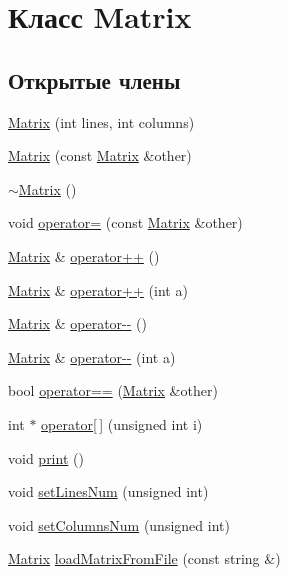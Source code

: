 \hypertarget{class_matrix}{\section{Класс Matrix}
\label{class_matrix}
}
\subsection*{Открытые члены}
\begin{DoxyCompactItemize}
\item 
\hyperlink{class_matrix_ad74c6b0c2db846ab723754759c52dad6}{Matrix} (int lines, int columns)
\item 
\hyperlink{class_matrix_abcf708e864ed3d9db2c3b317c5e529ab}{Matrix} (const \hyperlink{class_matrix}{Matrix} \&other)
\item 
\hyperlink{class_matrix_a9b1c3627f573d78a2f08623fdfef990f}{$\sim$\-Matrix} ()
\item 
void \hyperlink{class_matrix_a3ce481e0324e859ecca287b76e39473c}{operator=} (const \hyperlink{class_matrix}{Matrix} \&other)
\item 
\hyperlink{class_matrix}{Matrix} \& \hyperlink{class_matrix_a8507366342ab66e74b5a14226bf99791}{operator++} ()
\item 
\hyperlink{class_matrix}{Matrix} \& \hyperlink{class_matrix_a28c611cb965b7486d18a0a2ac4c45d2f}{operator++} (int a)
\item 
\hyperlink{class_matrix}{Matrix} \& \hyperlink{class_matrix_ad408cd4553ebed67bfd3fd5cc17f8423}{operator-\/-\/} ()
\item 
\hyperlink{class_matrix}{Matrix} \& \hyperlink{class_matrix_abecc73da1d79f5fd01cb7334e85b93e7}{operator-\/-\/} (int a)
\item 
bool \hyperlink{class_matrix_a1e08ad098ff5d0a8022d5c735f01c4cb}{operator==} (\hyperlink{class_matrix}{Matrix} \&other)
\item 
int $\ast$ \hyperlink{class_matrix_ae37518aad41f7aa920116dd2ca9a9656}{operator\mbox{[}$\,$\mbox{]}} (unsigned int i)
\item 
void \hyperlink{class_matrix_a99ba97122b8fdd54e95290caf80fc8e2}{print} ()
\item 
void \hyperlink{class_matrix_a04d8186abfddfcb928b5f69277a6b66f}{set\-Lines\-Num} (unsigned int)
\item 
void \hyperlink{class_matrix_af79f8f1854e16e5279d04a881c21eddb}{set\-Columns\-Num} (unsigned int)
\item 
\hyperlink{class_matrix}{Matrix} \hyperlink{class_matrix_a3097b9717038793d2d73157641e16aef}{load\-Matrix\-From\-File} (const string \&)

\end{DoxyCompactItemize}
